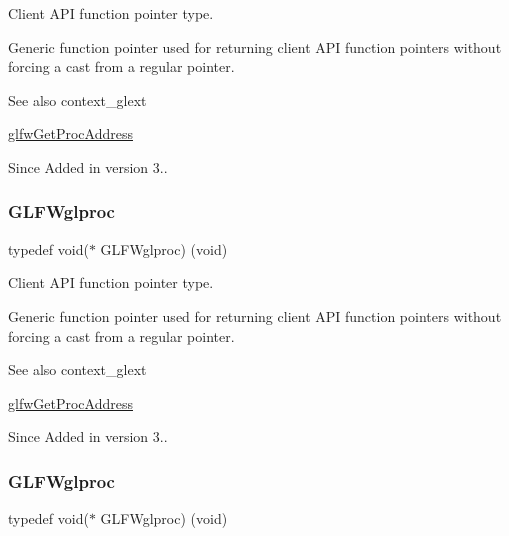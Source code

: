 Client A\+PI function pointer type. 

Generic function pointer used for returning client A\+PI function pointers without forcing a cast from a regular pointer.

\begin{DoxySeeAlso}{See also}
context\+\_\+glext 

\hyperlink{group__context_ga0e8af175218929615c16e74938c10f2a}{glfw\+Get\+Proc\+Address}
\end{DoxySeeAlso}
\begin{DoxySince}{Since}
Added in version 3.. 
\end{DoxySince}
\mbox{\label{group__context_ga3d47c2d2fbe0be9c505d0e04e91a133c}} 
\subsubsection{\texorpdfstring{G\+L\+F\+Wglproc}{GLFWglproc}\hspace{0.1cm}{\footnotesize\ttfamily [3/5]}}
{\footnotesize\ttfamily typedef void($\ast$ G\+L\+F\+Wglproc) (void)}



Client A\+PI function pointer type. 

Generic function pointer used for returning client A\+PI function pointers without forcing a cast from a regular pointer.

\begin{DoxySeeAlso}{See also}
context\+\_\+glext 

\hyperlink{group__context_ga0e8af175218929615c16e74938c10f2a}{glfw\+Get\+Proc\+Address}
\end{DoxySeeAlso}
\begin{DoxySince}{Since}
Added in version 3.. 
\end{DoxySince}
\mbox{\label{group__context_ga3d47c2d2fbe0be9c505d0e04e91a133c}} 
\subsubsection{\texorpdfstring{G\+L\+F\+Wglproc}{GLFWglproc}\hspace{0.1cm}{\footnotesize\ttfamily [4/5]}}
{\footnotesize\ttfamily typedef void($\ast$ G\+L\+F\+Wglproc) (void)}



